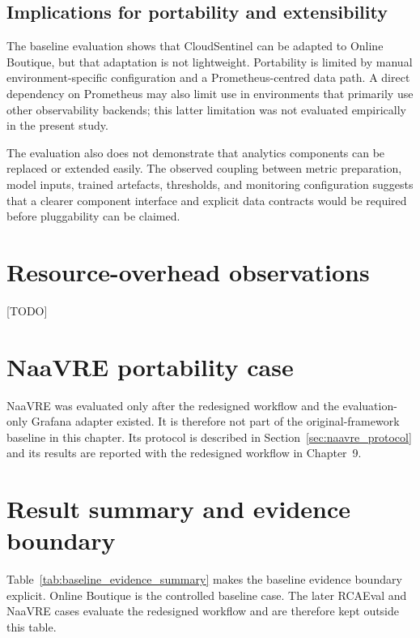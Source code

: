 \subsection{Implications for portability and extensibility}
The baseline evaluation shows that CloudSentinel can be adapted to Online Boutique, but that adaptation is not lightweight. Portability is limited by manual environment-specific configuration and a Prometheus-centred data path. A direct dependency on Prometheus may also limit use in environments that primarily use other observability backends; this latter limitation was not evaluated empirically in the present study.

The evaluation also does not demonstrate that analytics components can be replaced or extended easily. The observed coupling between metric preparation, model inputs, trained artefacts, thresholds, and monitoring configuration suggests that a clearer component interface and explicit data contracts would be required before pluggability can be claimed.

\section{Resource-overhead observations}
[TODO]


\section{NaaVRE portability case}
\label{sec:naavre_results}

NaaVRE was evaluated only after the redesigned workflow and the evaluation-only Grafana adapter existed. It is therefore not part of the original-framework baseline in this chapter. Its protocol is described in Section~\ref{sec:naavre_protocol} and its results are reported with the redesigned workflow in Chapter~9.

\section{Result summary and evidence boundary}
Table~\ref{tab:baseline_evidence_summary} makes the baseline evidence boundary explicit. Online Boutique is the controlled baseline case. The later RCAEval and NaaVRE cases evaluate the redesigned workflow and are therefore kept outside this table.

